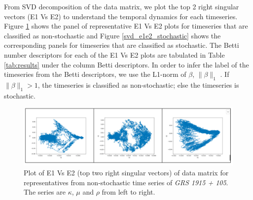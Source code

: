 \documentclass[10pt,conference]{IEEEtran}
\begin{document}

From SVD decomposition of the data matrix, we plot the top 2 right singular vectors (E1 Vs E2) to understand the temporal dynamics for each timeseries. Figure \ref{svd_e1e2_nonstochastic} shows the panel of representative E1 Vs E2 plots for timeseries  that are classified as non-stochastic and Figure \ref{svd_e1e2_stochastic}  shows the corresponding panels for timeseries that are classified as stochastic. The Betti number descriptors for each of the E1 Vs E2 plots are tabulated in Table \ref{tab:results} under the column Betti descriptors. In order to infer the label of the timeseries from the Betti descriptors, we use the L1-norm of $\beta$, $\|\beta\|_1$ . If $\|\beta\|_1 > 1$, the timeseries is classified as non-stochastic; else the timeseries is stochastic.

\begin{figure}[ht]
  \centering
  \includegraphics[width=\linewidth]{svd_non_stochastic.png}
  \caption{Plot of E1 Vs E2 (top two right singular vectors) of data matrix for  representatives from non-stochastic time series of \textit{GRS 1915 + 105}. The series are $\kappa$, $\mu$ and $\rho$ from left to right.}
  \label{svd_e1e2_nonstochastic}
\end{figure}
\end{document}
